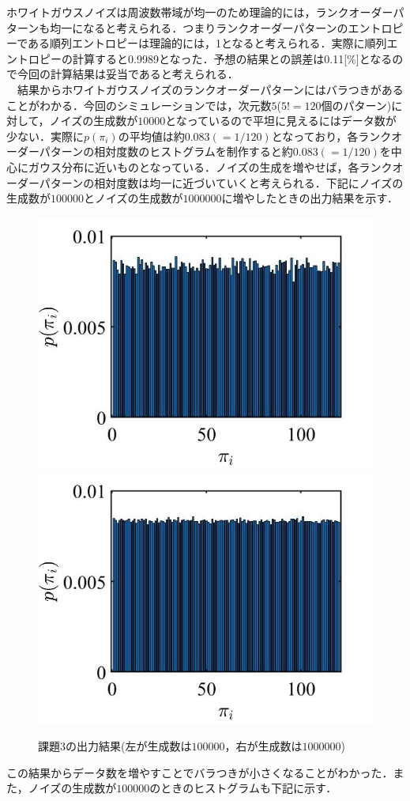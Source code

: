 \documentclass[autodetect-engine,dvipdfmx-if-dvi,ja=standard,a4paper,11pt]{bxjsarticle} %
\begin{document}
ホワイトガウスノイズは周波数帯域が均一のため理論的には，ランクオーダーパターンも均一になると考えられる．つまりランクオーダーパターンのエントロピーである順列エントロピーは理論的には，1となると考えられる．実際に順列エントロピーの計算すると0.9989となった．予想の結果との誤差は0.11[\%]となるので今回の計算結果は妥当であると考えられる．\\
　結果からホワイトガウスノイズのランクオーダーパターンにはバラつきがあることがわかる．今回のシミュレーションでは，次元数$5$($5!=120$個のパターン)に対して，ノイズの生成数が$10000$となっているので平坦に見えるにはデータ数が少ない．実際に$p(\pi_i)$の平均値は約$0.083(=1/120)$となっており，各ランクオーダーパターンの相対度数のヒストグラムを制作すると約$0.083(=1/120)$を中心にガウス分布に近いものとなっている．ノイズの生成を増やせば，各ランクオーダーパターンの相対度数は均一に近づいていくと考えられる．下記にノイズの生成数が$100000$とノイズの生成数が$1000000$に増やしたときの出力結果を示す．


\begin{figure}[H]%
\begin{center}
\includegraphics[width=.4\textwidth]{kadai3_result2.jpg}
\includegraphics[width=.4\textwidth]{kadai3_result3.jpg}
\end{center}
\caption{課題3の出力結果(左が生成数は$100000$，右が生成数は$1000000$)}%
\label{fig:kadai3_2}
\end{figure}

この結果からデータ数を増やすことでバラつきが小さくなることがわかった．また，ノイズの生成数が$100000$のときのヒストグラムも下記に示す．
\end{document}
